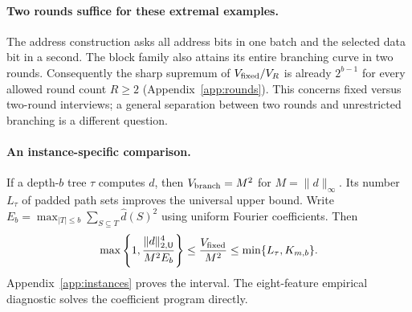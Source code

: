 \paragraph{Two rounds suffice for these extremal examples.}
The address construction asks all address bits in one batch and the selected data bit in a second. The block family also attains its entire branching curve in two rounds. Consequently the sharp supremum of $V_{\rm fixed}/V_R$ is already $2^{b-1}$ for every allowed round count $R\ge2$ (Appendix~\ref{app:rounds}). This concerns fixed versus two-round interviews; a general separation between two rounds and unrestricted branching is a different question.


\paragraph{An instance-specific comparison.}
If a depth-$b$ tree $\tau$ computes $d$, then $V_{\rm branch}=M^2$ for $M=\|d\|_\infty$. Its number $L_\tau$ of padded path sets improves the universal upper bound. Write $E_b=\max_{|T|\le b}\sum_{S\subseteq T}\widehat d(S)^2$ using uniform Fourier coefficients. Then
\[
 \max\left\{1,\frac{\|d\|_{2,\mathsf U}^4}{M^2 E_b}\right\}
 \le\frac{V_{\rm fixed}}{M^2}\le\min\{L_\tau,K_{m,b}\}.
\]
Appendix~\ref{app:instances} proves the interval. The eight-feature empirical diagnostic solves the coefficient program directly.

